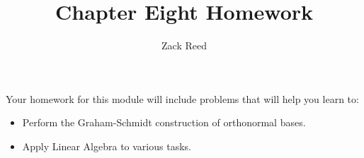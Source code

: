 \documentclass{ximera}
\author{Zack Reed}
\title{Chapter Eight Homework}
\begin{document}
 
\begin{abstract}
\end{abstract}
 
\maketitle
 
Your homework for this module will include problems that will help you learn to:
 
\begin{itemize}
\item Perform the Graham-Schmidt construction of orthonormal bases. 
\item Apply Linear Algebra to various tasks.
\end{itemize}
 
 
\end{document}
